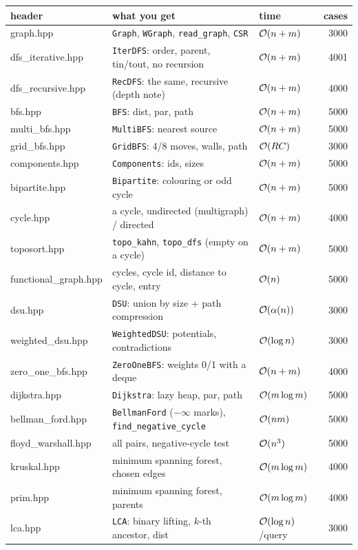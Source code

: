 \begin{table}[H]
\centering\small
\begin{tabularx}{\linewidth}{@{}>{\ttfamily\raggedright\arraybackslash}p{3.3cm} >{\raggedright\arraybackslash}X >{\raggedright\arraybackslash}p{2.4cm} r@{}}
\toprule
\textrm{\textbf{header}} & \textbf{what you get} & \textbf{time} & \textbf{cases} \\
\midrule
graph.hpp & \texttt{Graph}, \texttt{WGraph}, \texttt{read\_graph}, \texttt{CSR} & $\mathcal{O}(n+m)$ & 3000 \\
dfs\_iterative.hpp & \texttt{IterDFS}: order, parent, tin/tout, no recursion & $\mathcal{O}(n+m)$ & 4001 \\
dfs\_recursive.hpp & \texttt{RecDFS}: the same, recursive (depth note) & $\mathcal{O}(n+m)$ & 4000 \\
bfs.hpp & \texttt{BFS}: dist, par, path & $\mathcal{O}(n+m)$ & 5000 \\
multi\_bfs.hpp & \texttt{MultiBFS}: nearest source & $\mathcal{O}(n+m)$ & 5000 \\
grid\_bfs.hpp & \texttt{GridBFS}: 4/8 moves, walls, path & $\mathcal{O}(RC)$ & 3000 \\
components.hpp & \texttt{Components}: ids, sizes & $\mathcal{O}(n+m)$ & 5000 \\
bipartite.hpp & \texttt{Bipartite}: colouring or odd cycle & $\mathcal{O}(n+m)$ & 5000 \\
cycle.hpp & a cycle, undirected (multigraph) / directed & $\mathcal{O}(n+m)$ & 4000 \\
toposort.hpp & \texttt{topo\_kahn}, \texttt{topo\_dfs} (empty on a cycle) & $\mathcal{O}(n+m)$ & 5000 \\
functional\_graph.hpp & cycles, cycle id, distance to cycle, entry & $\mathcal{O}(n)$ & 5000 \\
dsu.hpp & \texttt{DSU}: union by size + path compression & $\mathcal{O}(\alpha(n))$ & 3000 \\
weighted\_dsu.hpp & \texttt{WeightedDSU}: potentials, contradictions & $\mathcal{O}(\log n)$ & 3000 \\
zero\_one\_bfs.hpp & \texttt{ZeroOneBFS}: weights 0/1 with a deque & $\mathcal{O}(n+m)$ & 4000 \\
dijkstra.hpp & \texttt{Dijkstra}: lazy heap, par, path & $\mathcal{O}(m\log m)$ & 5000 \\
bellman\_ford.hpp & \texttt{BellmanFord} ($-\infty$ marks), \texttt{find\_negative\_cycle} & $\mathcal{O}(nm)$ & 5000 \\
floyd\_warshall.hpp & all pairs, negative-cycle test & $\mathcal{O}(n^3)$ & 5000 \\
kruskal.hpp & minimum spanning forest, chosen edges & $\mathcal{O}(m\log m)$ & 4000 \\
prim.hpp & minimum spanning forest, parents & $\mathcal{O}(m\log m)$ & 4000 \\
lca.hpp & \texttt{LCA}: binary lifting, $k$-th ancestor, dist & $\mathcal{O}(\log n)$/query & 3000 \\
\bottomrule
\end{tabularx}
\end{table}

